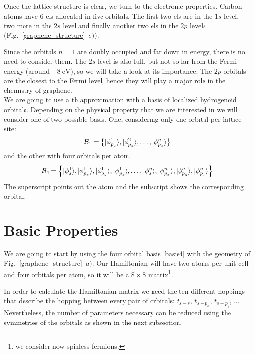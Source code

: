 Once the lattice structure is clear, we turn to the electronic properties. Carbon atoms have 6 \acp{el} allocated in five orbitals. The first two \acp{el} are in the $1s$ level, two more in the $2s$ level and finally another two \acp{el} in the $2p$ levels (Fig.~\ref{graphene_structure}~$e)$).

Since the orbitals $n=1$ are doubly occupied and far down in energy, there is no need to consider them. The $2s$ level is also full, but not so far from the Fermi energy (around $\SI{-8}{\eV}$), so we will take a look at its importance. The $2p$ orbitals are the closest to the Fermi level, hence they will play a major role in the chemistry of graphene.\\

We are going to use a \ac{tb} approximation with a basis of localized hydrogenoid orbitals. Depending on the physical property that we are interested in we will consider one of two possible basis.
One, considering only one orbital per lattice site:
\begin{equation}
  \mathcal{B}_1 = \left\{|\phi^1_{p_z}\rangle, |\phi^2_{p_z}\rangle,\dots, |\phi^n_{p_z}\rangle\right\}
\label{basis1}
\end{equation}
and the other with four orbitals per atom.
\begin{equation}
  \mathcal{B}_4 = \left\{
  |\phi^1_{s}\rangle,|\phi^1_{p_x}\rangle,|\phi^1_{p_y}\rangle,|\phi^1_{p_z}\rangle,
  \dots,
  |\phi^n_{s}\rangle,|\phi^n_{p_x}\rangle,|\phi^n_{p_y}\rangle,|\phi^n_{p_z}\rangle
  \right\}
\label{basis4}
\end{equation}
The superscript points out the atom and the subscript shows the corresponding orbital.

\section{Basic Properties}
\label{sec:graphene_basic_properties}
We are going to start by using the four orbital basis \eqref{basis4} with the geometry of Fig.~\ref{graphene_structure}~$a)$. Our Hamiltonian will have two atoms per unit cell and four orbitals per atom, so it will be a $8\times8$ matrix\footnote{we consider now spinless fermions.}.

In order to calculate the Hamiltonian matrix we need the ten different hoppings that describe the hopping between every pair of orbitals: $t_{s-s}$, $t_{s-p_x}$, $t_{s-p_y}$, ... Nevertheless, the number of parameters necessary can be reduced using the symmetries of the orbitals as shown in the next subsection.


